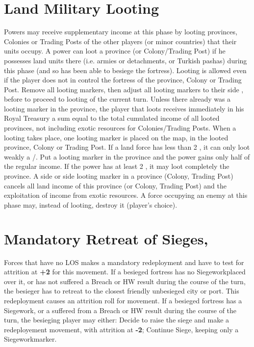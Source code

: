 \section{Land Military Looting}

Powers may receive supplementary income at this phase by looting provinces,
Colonies or Trading Posts of the other players (or minor countries) that their
units occupy.
\aparag A power can loot a province (or Colony/Trading Post) if he possesses
land units there (i.e. armies or detachments, or Turkish pashas) during this
phase (and so has been able to besiege the fortress).  Looting is allowed even
if the player does not in control the fortress of the province, Colony or
Trading Post.
Remove all \Facemoins looting markers, then adjust all \Faceplus looting
markers to their side \Facemoins, before to proceed to looting of the current
turn.
Unless there already was a looting marker in the province, the player that
loots receives immediately in his Royal Treasury a sum equal to the total
cumulated income of all looted provinces, not including exotic resources for
Colonies/Trading Posts.
When a looting takes place, one looting marker \Faceplus is placed on the map,
in the looted province, Colony or Trading Post.
If a land force has less than 2 \LD, it can only loot weakly a \COL/\TP.  Put
a \Facemoins looting marker in the province and the power gains only half of
the regular income.  If the power has at least 2 \LD, it may loot completely
the province.
A side \Faceplus or side \Facemoins looting marker in a province (Colony,
Trading Post) cancels all land income of this province (or Colony, Trading
Post) and the exploitation of income from exotic resources.
A force occupying an enemy \TP at this phase may, instead of looting, destroy
it (player's choice).



\section{Mandatory Retreat of Sieges, \Presidios}

 Forces that have no LOS makes a mandatory redeployment
and have to test for attrition at {\bf +2} for this movement.
If a besieged fortress has no Siegework\faceplus placed over it, or has not
suffered a Breach or HW result during the course of the turn, the besieger has
to retreat to the closest friendly unbesieged city or port. This redeployment
causes an attrition roll for movement.
If a besieged fortress has a Siegework\faceplus, or a suffered from a Breach
or HW result during the course of the turn, the besieging player may either:
\bparag Decide to raise the siege and make a redeployement movement, with
attrition at {\bf -2};
\bparag Continue Siege, keeping only a Siegework\facemoins marker.

